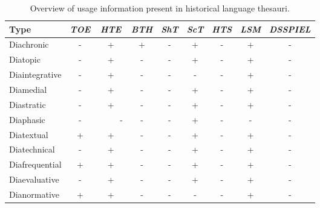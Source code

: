 \begin{table}[h!]
    \centering
    \small
    { \setlength{\tabcolsep}{0.08in}
    \begin{tabular}{lcccccccc}
    \toprule
        \textbf{Type} &
        \textbf{\textit{TOE}} &
        \textbf{\textit{HTE}} &
        \textbf{\textit{BTH}} &
        \textbf{\textit{ShT}} &
        \textbf{\textit{ScT}} &
        \textbf{\textit{HTS}} &
        \textbf{\textit{LSM}} &
        \textbf{\textit{DSSPIEL}} \\
    \midrule
Diachronic &

- &
+ &
+ &
- &
+ &
- &
+ &
- \\

Diatopic &

- &
+ &
- &
- &
+ &
- &
+ &
- \\
Diaintegrative &

- &
+ &
- &
- &
- &
- &
+ &
- \\
Diamedial &

- &
+ &
- &
- &
+ &
- &
+ &
- \\
Diastratic &

- &
+ &
- &
- &
+ &
- &
+ &
- \\
Diaphasic &

- &
~~~~~- \protect\footnotemark &
- &
- &
+ &
- &
- &
- \\
Diatextual &

+ &
+ &
- &
- &
+ &
- &
+ &
- \\
Diatechnical &

- &
+ &
- &
- &
+ &
- &
+ &
- \\
Diafrequential &

+ &
+ &
- &
- &
+ &
- &
+ &
- \\
Diaevaluative &

- &
+ &
- &
- &
+ &
- &
+ &
- \\
Dianormative &

+ &
+ &
- &
- &
- &
- &
+ &
- \\
    \midrule
    \end{tabular}
    }
    \caption[]{\label{table:Stolk_thes-content:HLT-usage-info}Overview of usage information present in historical language thesauri.}
\end{table}



